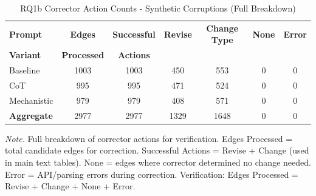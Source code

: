 \begin{table}[H]
\centering
\caption{RQ1b Corrector Action Counts - Synthetic Corruptions (Full Breakdown)}
\label{tab:rq1b_action_counts_synthetic}
\begin{threeparttable}
\begin{tabular}{lcccccc}
\toprule
\textbf{Prompt} & \textbf{Edges} & \textbf{Successful} & \textbf{Revise} & \textbf{Change Type} & \textbf{None} & \textbf{Error} \\
\textbf{Variant} & \textbf{Processed} & \textbf{Actions} & & & & \\
\midrule
Baseline & 1003 & 1003 & 450 & 553 & 0 & 0 \\
CoT & 995 & 995 & 471 & 524 & 0 & 0 \\
Mechanistic & 979 & 979 & 408 & 571 & 0 & 0 \\
\midrule
\textbf{Aggregate} & 2977 & 2977 & 1329 & 1648 & 0 & 0 \\
\bottomrule
\end{tabular}
\begin{tablenotes}
\small
\item \textit{Note.} Full breakdown of corrector actions for verification. 
Edges Processed = total candidate edges for correction.
Successful Actions = Revise + Change (used in main text tables).
None = edges where corrector determined no change needed.
Error = API/parsing errors during correction.
Verification: Edges Processed = Revise + Change + None + Error.
\end{tablenotes}
\end{threeparttable}
\end{table}

